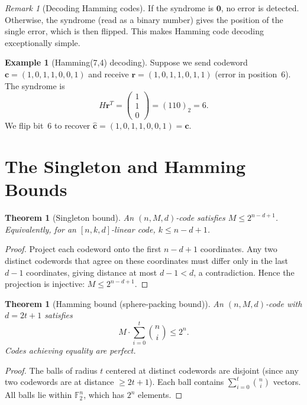 \documentclass[12pt,a4paper,openany]{book}
\theoremstyle{definition}
\newtheorem{example}[definition]{Example}
\theoremstyle{plain}
\newtheorem{theorem}[definition]{Theorem}
\theoremstyle{remark}
\newtheorem{remark}[definition]{Remark}
\begin{document}
\begin{remark}[Decoding Hamming codes]
\label{rem:hamming-decode}
If the syndrome is $\mathbf{0}$, no error is detected.  Otherwise, the
syndrome (read as a binary number) gives the position of the single
error, which is then flipped.  This makes Hamming code decoding
exceptionally simple.
\end{remark}

\begin{example}[Hamming(7,4) decoding]
\label{ex:hamming-decode}
Suppose we send codeword $\mathbf{c}=(1,0,1,1,0,0,1)$ and receive
$\mathbf{r}=(1,0,1,1,0,1,1)$ (error in position~$6$).  The syndrome is
\[
  H\mathbf{r}^T=\begin{pmatrix}1\\1\\0\end{pmatrix}
  =(110)_2=6.
\]
We flip bit~$6$ to recover $\hat{\mathbf{c}}=(1,0,1,1,0,0,1)=\mathbf{c}$.
\end{example}


\section{The Singleton and Hamming Bounds}
\label{sec:bounds}

\begin{theorem}[Singleton bound]
\label{thm:singleton}
An $(n,M,d)$-code satisfies $M\le 2^{n-d+1}$.  Equivalently, for an
$[n,k,d]$-linear code, $k\le n-d+1$.
\end{theorem}

\begin{proof}
Project each codeword onto the first $n-d+1$ coordinates.  Any two
distinct codewords that agree on these coordinates must differ only
in the last $d-1$ coordinates, giving distance at most $d-1<d$, a
contradiction.  Hence the projection is injective:
$M\le 2^{n-d+1}$.
\end{proof}

\begin{theorem}[Hamming bound (sphere-packing bound)]
\label{thm:hamming-bound}
An $(n,M,d)$-code with $d=2t+1$ satisfies
\[
  M\cdot\sum_{i=0}^{t}\binom{n}{i}\le 2^n.
\]
Codes achieving equality are \emph{perfect}.
\end{theorem}

\begin{proof}
The balls of radius $t$ centered at distinct codewords are disjoint
(since any two codewords are at distance $\ge 2t+1$).  Each ball
contains $\sum_{i=0}^t\binom{n}{i}$ vectors.  All balls lie within
$\mathbb{F}_2^n$, which has $2^n$ elements.
\end{proof}
\end{document}
